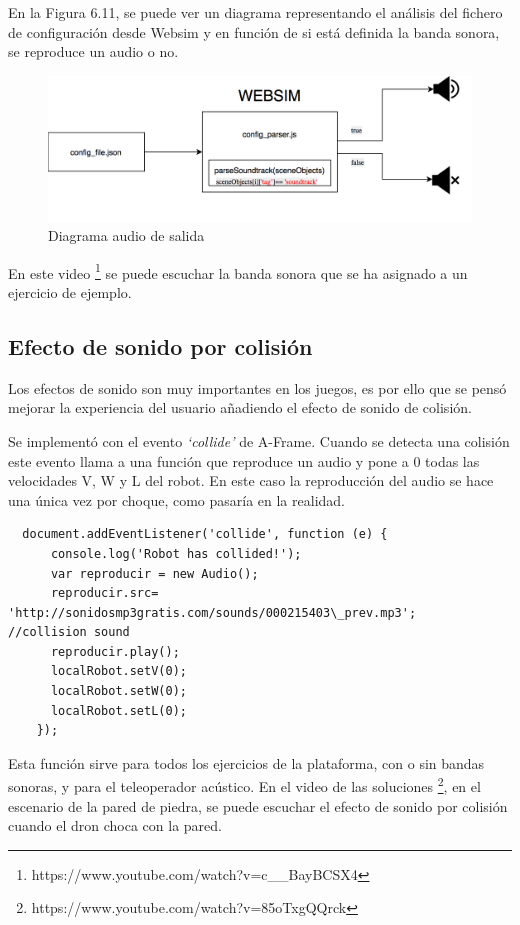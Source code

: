 En la Figura 6.11, se puede ver un diagrama representando el análisis del fichero de configuración desde Websim y en función de si está definida la banda sonora, se reproduce un audio o no. 
\begin{figure}[H]
    \centering
    \includegraphics[width=1\textwidth, height=0.25\textwidth]{chapters/images/diagramaaudioout.png}
    \caption{Diagrama audio de salida}
    \label{fig:my_label}
\end{figure}

En este video \footnote{https://www.youtube.com/watch?v=c\_\_BayBCSX4} se puede escuchar la banda sonora que se ha asignado a un ejercicio de ejemplo.

\subsection{Efecto de sonido por colisión }

Los efectos de sonido son muy importantes en los juegos, es por ello que se pensó mejorar la experiencia del usuario añadiendo el efecto de sonido de colisión. 

Se implementó con el evento \textit{`collide'} de A-Frame. Cuando se detecta una colisión este evento llama a una función que reproduce un audio y pone a 0 todas las velocidades V, W y L del robot.  En este caso la reproducción del audio se hace una única vez por choque, como pasaría en la realidad.

\begin{lstlisting}
  document.addEventListener('collide', function (e) {
      console.log('Robot has collided!');
      var reproducir = new Audio();
      reproducir.src= 'http://sonidosmp3gratis.com/sounds/000215403\_prev.mp3';   //collision sound
      reproducir.play();
      localRobot.setV(0);
      localRobot.setW(0);
      localRobot.setL(0);
	});
\end{lstlisting}

Esta función sirve para todos los ejercicios de la plataforma, con o sin  bandas sonoras, y para el teleoperador acústico. En el video de las soluciones  \footnote{https://www.youtube.com/watch?v=85oTxgQQrck},  en el escenario de la pared de piedra, se puede escuchar el efecto de sonido por colisión cuando el dron choca con la pared.
